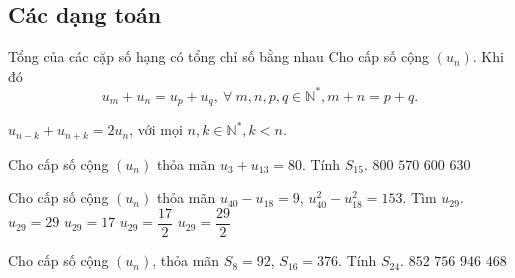 \subsection{Các dạng toán}
\begin{dang}{Tổng của các cặp số hạng có tổng chỉ số bằng nhau}
Cho cấp số cộng $(u_n)$. Khi đó
\[u_m+u_n=u_p+u_q,\ \forall\ m,n,p,q\in\mathbb{N}^*,m+n=p+q .\]
\begin{hq}
$u_{n-k}+u_{n+k}=2u_n$, với mọi $n,k\in \mathbb{N}^*, k<n$.
\end{hq}
\end{dang}

\begin{vd}%
Cho cấp số cộng $(u_n)$ thỏa mãn $u_3+u_{13}=80$. Tính $S_{15}$.
\choice
{$800$}
{$570$}
{\True $600$}
{$630$}
\end{vd}

\begin{vd}%
Cho cấp số cộng $(u_n)$ thỏa mãn $u_{40}-u_{18}=9$, $u_{40}^2-u_{18}^2=153$. Tìm $u_{29}$.
\choice
{$u_{29}=29$}
{$u_{29}=17$}
{\True $u_{29}=\dfrac{17}{2}$}
{$u_{29}=\dfrac{29}{2}$}
\end{vd}

\begin{vd}%
Cho cấp số cộng $(u_n)$, thỏa mãn $S_{8}=92$, $S_{16}=376$. Tính $S_{24}$.
\choice
{\True $852$}
{$756$}
{$946$}
{$468$}
\end{vd}

